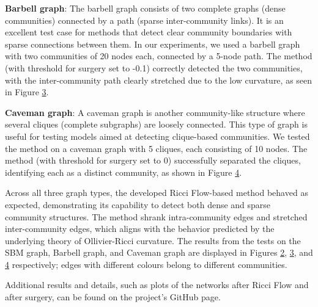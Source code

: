 \documentclass[12pt,a4paper]{article}
\begin{document}
\textbf{Barbell graph}: The barbell graph consists of two complete graphs (dense communities) connected by a path (sparse inter-community links). It is an excellent test case for methods that detect clear community boundaries with sparse connections between them. In our experiments, we used a barbell graph with two communities of 20 nodes each, connected by a 5-node path. The method  (with threshold for surgery set to -0.1) correctly detected the two communities, with the inter-community path clearly stretched due to the low curvature, as seen in Figure \hyperref[fig3]{3}.

\textbf{Caveman graph}: A caveman graph is another community-like structure where several cliques (complete subgraphs) are loosely connected. This type of graph is useful for testing models aimed at detecting clique-based communities. We tested the method on a caveman graph with 5 cliques, each consisting of 10 nodes. The method (with threshold for surgery set to 0) successfully separated the cliques, identifying each as a distinct community, as shown in Figure \hyperref[fig4]{4}.

Across all three graph types, the developed Ricci Flow-based method behaved as expected, demonstrating its capability to detect both dense and sparse community structures. The method shrank intra-community edges and stretched inter-community edges, which aligns with the behavior predicted by the underlying theory of Ollivier-Ricci curvature. The results from the tests on the SBM graph, Barbell graph, and Caveman graph are displayed in Figures \hyperref[fig2]{2}, \hyperref[fig3]{3}, and \hyperref[fig4]{4} respectively; edges with different colours belong to different communities. 

Additional results and details, such as plots of the networks after Ricci Flow and after surgery,  can be found on the project's GitHub page.
\end{document}
